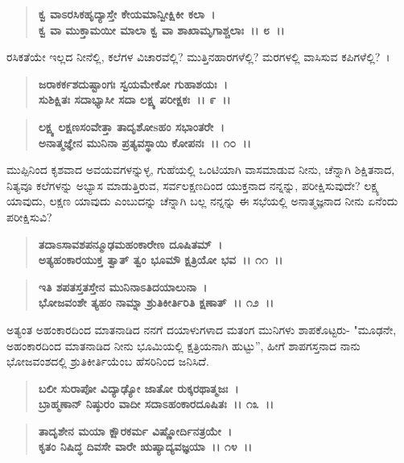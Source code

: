 \begin{verse}
\textbf{ಕ್ವ ವಾಽರಸಿಕಹೃದ್ಯಾಸ್ತೇ ಕೇಯಮಾನ್ವೀಕ್ಷಿಕೀ ಕಲಾ~।}\\\textbf{ಕ್ವ ವಾ ಮುಕ್ತಾಮಯೀ ಮಾಲಾ ಕ್ವ ವಾ ಶಾಖಾಮೃಗಾಶ್ಚಲಾಃ~।। ೮~।। }
\end{verse}

ರಸಿಕತೆಯೇ ಇಲ್ಲದ ನೀನೆಲ್ಲಿ, ಕಲೆಗಳ ವಿಚಾರವೆಲ್ಲಿ? ಮುತ್ತಿನಹಾರಗಳೆಲ್ಲಿ? ಮರಗಳಲ್ಲಿ ವಾಸಿಸುವ ಕಪಿಗಳೆಲ್ಲಿ?~।

\begin{verse}
\textbf{ಜರಾಕರ್ಕಶದುಷ್ಟಾಂಗಃ ಸ್ವಯಮೇಕೋ ಗುಹಾಶಯಃ~।}\\\textbf{ಸುಶಿಕ್ಷಿತಃ ಸದಾಭ್ಯಾಸೀ ಸದಾ ಲಕ್ಷ್ಯ ಪರೀಕ್ಷಕಃ~।। ೯~।। }
\end{verse}

\begin{verse}
\textbf{ಲಕ್ಷ್ಯ ಲಕ್ಷಣಸಂವೇತ್ತಾ ತಾದೃಶೋsಹಂ ಸಭಾಂತರೇ~।}\\\textbf{ಅನಾತ್ಮಜ್ಞೇನ ಮುನಿನಾ ಪ್ರತ್ಯವಸ್ಥಾಯಿ ಕೋಪನಃ~।। ೧೦~।।}
\end{verse}

ಮುಪ್ಪಿನಿಂದ ಕೃಶವಾದ ಅವಯವಗಳನ್ನುಳ್ಳ, ಗುಹೆಯಲ್ಲಿ ಒಂಟಿಯಾಗಿ ವಾಸಮಾಡುವ ನೀನು, ಚೆನ್ನಾಗಿ ಶಿಕ್ಷಿತನಾದ, ನಿತ್ಯವೂ ಕಲೆಗಳನ್ನು ಅಭ್ಯಾಸ ಮಾಡುತ್ತಿರುವ, ಸರ್ವಲಕ್ಷಣದಿಂದ ಯುಕ್ತನಾದ ನನ್ನನ್ನು, ಪರೀಕ್ಷಿಸುವುದೇ? ಲಕ್ಷ್ಯ ಯಾವುದು, ಲಕ್ಷಣ ಯಾವುದು ಎಂಬುದನ್ನು ಚೆನ್ನಾಗಿ ಬಲ್ಲ ನನ್ನನ್ನು ಈ ಸಭೆಯಲ್ಲಿ ಅನಾತ್ಮಜ್ಞನಾದ ನೀನು ಏನೆಂದು ಪರೀಕ್ಷಿಸುವಿ?

\begin{verse}
\textbf{ತದಾಽಸಾವಶಪನ್ಮೂಢಮಹಂಕಾರೇಣ ದೂಷಿತಮ್~।}\\\textbf{ಅತ್ಯಹಂಕಾರಯುಕ್ತ ತ್ವಾತ್ ತ್ವಂ ಭೂಮೌ ಕ್ಷತ್ರಿಯೋ ಭವ~।। ೧೧~।।} 
\end{verse}

\begin{verse}
\textbf{ಇತಿ ಶಪತಸ್ತತಸ್ತೇನ ಮುನಿನಾಽತಿದಯಾಲುನಾ~।}\\\textbf{ಭೋಜವಂಶೇ ತ್ಯಹಂ ನಾಮ್ನಾ ಶ್ರುತಿಕೀರ್ತಿರಿತಿ ಕ್ಷಣಾತ್~।। ೧೨~।।} 
\end{verse}

ಅತ್ಯಂತ ಅಹಂಕಾರದಿಂದ ಮಾತನಾಡಿದ ನನಗೆ ದಯಾಳುಗಳಾದ ಮತಂಗ ಮುನಿಗಳು ಶಾಪಕೊಟ್ಟರು- "ಮೂಢನೇ, ಅಹಂಕಾರದಿಂದ ಮಾತನಾಡಿದ ನೀನು ಭೂಮಿಯಲ್ಲಿ ಕ್ಷತ್ರಿಯನಾಗಿ ಹುಟ್ಟು”, ಹೀಗೆ ಶಾಪಗಸ್ತನಾದ ನಾನು ಭೋಜವಂಶದಲ್ಲಿ ಶ್ರುತಿಕೀರ್ತಿಯೆಂಬ ಹೆಸರಿನಿಂದ ಜನಿಸಿದೆ.

\begin{verse}
\textbf{ಬಲೀ ಸುರಾಪೋ ವಿದ್ಯಾಢ್ಯೋ ಜಾತೋ ರುಕ್ಕರಥಾತ್ಮಜಃ~।}\\\textbf{ಬ್ರಾಹ್ಮಣಾನ್ ನಿಷ್ಠುರಂ ವಾದೀ ಸದಾಽಹಂಕಾರದೂಷಿತಃ~।। ೧೩~।। }
\end{verse}

\begin{verse}
\textbf{ತಾದೃಶೇನ ಮಯಾ ಕ್ಷೌರಕರ್ಮ ವಿಷ್ಣೋರ್ದಿನತ್ರಯೇ~।}\\\textbf{ಕೃತಂ ನಿಷಿದ್ಧ ದಿವಸೇ ವಾರೇ ಋಷ್ಯಾದ್ಯವಜ್ಞಯಾ~।। ೧೪~।।}
\end{verse}

